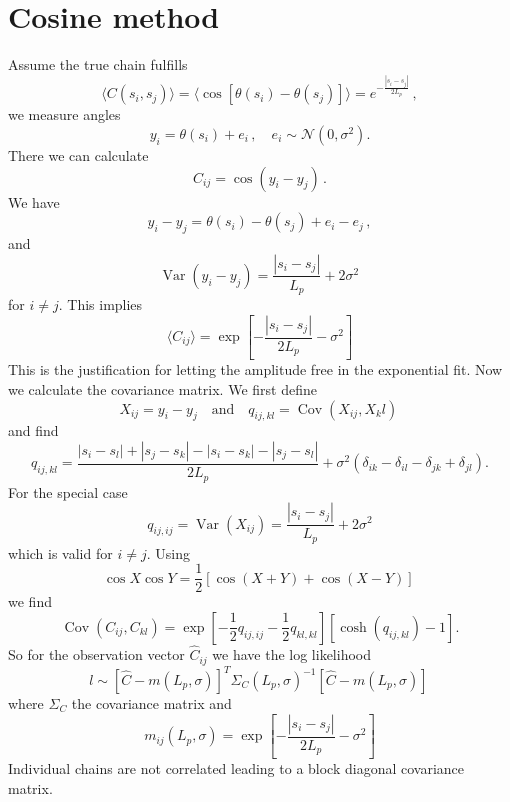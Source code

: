 \documentclass[twocolumn,aps,prxlife,longbibliography,amsmath,amssymb,floatfix,superscriptaddress,showkeys]{revtex4-2}
\begin{document}
\section{Cosine method}
Assume the true chain fulfills
\begin{equation}
  \langle C(s_i, s_j) \rangle =  \langle \cos\left[ \theta(s_i) - \theta(s_j) \right] \rangle = e^{-\frac{|s_i-s_j|}{2L_p}} \, ,
\end{equation} 
we measure angles
\begin{equation}
  y_i = \theta(s_i) + e_i \, ,  \quad e_i \sim \mathcal{N}(0, \sigma^2).
\end{equation}
There we can calculate 
\begin{equation}
  C_{ij} = \cos(y_i - y_j) \, .
\end{equation}
We have
\begin{equation}
  y_i - y_j = \theta(s_i) - \theta(s_j) + e_i - e_j \, ,
\end{equation}
and 
\begin{equation}
  \operatorname{Var}(y_i-y_j) = \frac{|s_i-s_j|}{L_p}+2\sigma^2 \,
\end{equation}
for $i\neq j$. This implies
\begin{equation}
  \langle C_{ij} \rangle = \exp\left[ -\frac{|s_i - s_j|}{2L_p} - \sigma^2 \right]
\end{equation}
This is the justification for letting the amplitude free in the exponential fit. 
Now we calculate the covariance matrix.
We first define
\begin{equation}
  X_{ij} = y_i - y_j \quad \text{and} \quad q_{ij,kl} = \operatorname{Cov}(X_{ij}, X_kl) \,
\end{equation}
and find
\begin{equation}
  q_{ij,kl} = \frac{|s_i - s_l| + |s_j - s_k| - |s_i - s_k| - |s_j-s_l|}{2L_p} + \sigma^2(\delta_{ik} - \delta_{il} - \delta_{jk} + \delta_{jl}).
\end{equation}
For the special case
\begin{equation}
  q_{ij,ij} = \operatorname{Var}(X_{ij}) = \frac{|s_i - s_j|}{L_p} + 2\sigma^2
\end{equation}
which is valid for $i\neq j$.
Using 
\begin{equation}
  \cos X \cos Y = \frac{1}{2}[\cos(X+Y)+\cos(X-Y)] \,  
\end{equation}
we find
\begin{equation}
  \operatorname{Cov}(C_{ij},C_{kl})=\exp \left[-\frac{1}{2}q_{ij,ij} -\frac{1}{2}q_{kl,kl} \right] \left[\cosh(q_{ij,kl}) - 1 \right].
\end{equation}
So for the observation vector $\hat{C}_{ij}$ we have the log likelihood
\begin{equation}
  l \sim \left[\hat{C} - m(L_p,\sigma) \right]^T \Sigma_C(L_p, \sigma)^{-1} \left[\hat{C} - m(L_p,\sigma) \right] \,
\end{equation}
where $\Sigma_C$ the covariance matrix and
\begin{equation}
  m_{ij}(L_p, \sigma) = \exp \left[- \frac{|s_i - s_j|}{2L_p} - \sigma^2\right]
\end{equation}
Individual chains are not correlated leading to a block diagonal covariance matrix.
\end{document}
